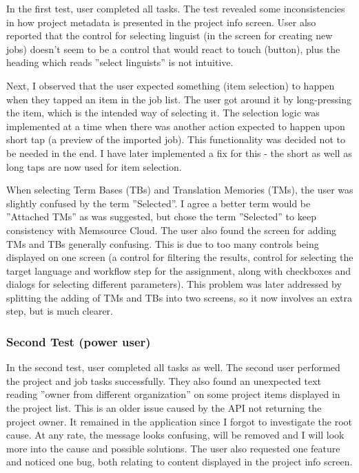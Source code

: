In the first test, user completed all tasks. The test revealed some inconsistencies in how project metadata is presented in the project info screen. User also reported that the control for selecting linguist (in the screen for creating new jobs) doesn’t seem to be a control that would react to touch (button), plus the heading which reads ''select linguists'' is not intuitive. 

Next, I observed that the user expected something (item selection) to happen when they tapped an item in the job list. The user got around it by long-pressing the item, which is the intended way of selecting it. The selection logic was implemented at a time when there was another action expected to happen upon short tap (a preview of the imported job). This functionality was decided not to be needed in the end. I have later implemented a fix for this - the short as well as long taps are now used for item selection. 


When selecting Term Bases (TBs) and Translation Memories (TMs), the user was slightly confused by the term ''Selected''. I agree a better term would be ''Attached TMs'' as was suggested, but chose the term ''Selected'' to keep consistency with Memsource Cloud. The user also found the screen for adding TMs and TBs generally confusing. This is due to too many controls being displayed on one screen (a control for filtering the results, control for selecting the target language and workflow step for the assignment, along with checkboxes and dialogs for selecting different parameters). This problem was later addressed by splitting the adding of TMs and TBs into two screens, so it now involves an extra step, but is much clearer.


\subsubsection{Second Test (power user)}

In the second test, user completed all tasks as well. The second user performed the project and job tasks successfully. They also found an unexpected text reading ''owner from different organization'' on some project items displayed in the project list. This is an older issue caused by the API not returning the project owner. It remained in the application since I forgot to investigate the root cause. At any rate, the message looks confusing, will be removed and I will look more into the cause and possible solutions. The user also requested one feature and noticed one bug, both relating to content displayed in the project info screen.

